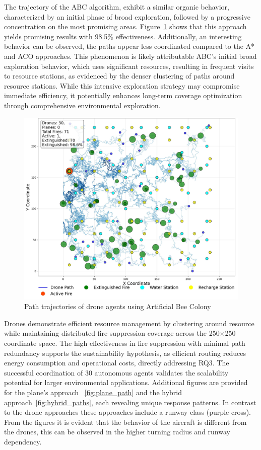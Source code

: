 \documentclass[11pt, a4paper]{article}
\begin{document}
The trajectory of the ABC algorithm, exhibit a similar organic behavior, characterized by an initial phase of broad exploration, followed by a progressive concentration on the most promising areas. Figure~\ref{fig:abc} shows that this approach yields promising results with 98.5\% effectiveness. Additionally, an interesting behavior can be observed, the paths appear less coordinated compared to the A* and ACO approaches. This phenomenon is likely attributable ABC's initial broad exploration behavior, which uses significant resources, resulting in frequent visits to resource stations, as evidenced by the denser clustering of paths around resource stations. While this intensive exploration strategy may compromise immediate efficiency, it potentially enhances long-term coverage optimization through comprehensive environmental exploration.

\begin{figure}[htbp]
    \centering
    \includegraphics[width=1\linewidth]{figures/Artificial_Bee_Colony_agent_paths.jpeg}
    \caption{Path trajectories of drone agents using Artificial Bee Colony}
    \label{fig:abc}
\end{figure}

Drones demonstrate efficient resource management by clustering around resource  while maintaining distributed fire suppression coverage across the 250×250 coordinate space. The high effectiveness in fire suppression with minimal path redundancy supports the sustainability hypothesis, as efficient routing reduces energy consumption and operational costs, directly addressing RQ3. The successful coordination of 30 autonomous agents validates the scalability potential for larger environmental applications.
Additional figures are provided for the plane’s approach ~\ref{fig:plane_path} and the hybrid approach~\ref{fig:hybrid_paths}, each revealing unique response patterns. In contrast to the drone approaches these approaches include a runway class (purple cross). From the figures it is evident that the behavior of the aircraft is different from the drones, this can be observed in the higher turning radius and runway dependency.
\end{document}
